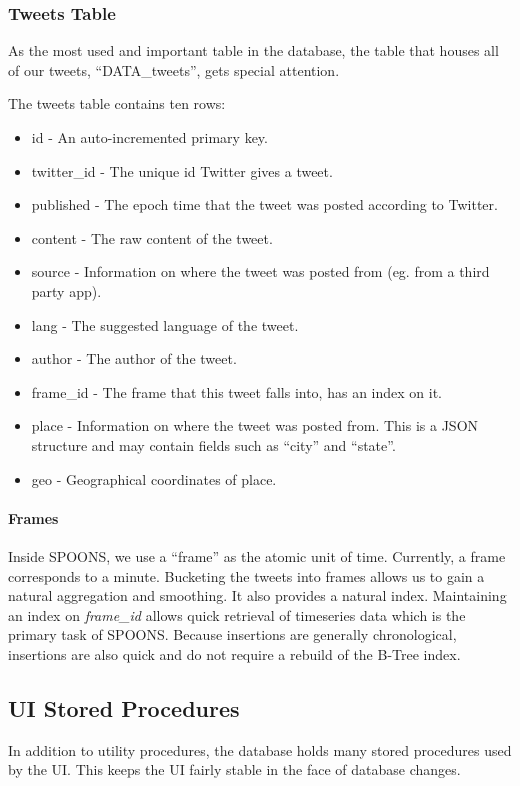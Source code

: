\documentclass[12pt]{ucthesis}
\begin{document}
\subsubsection{Tweets Table}
\label{arch-database-tables-tweets}
As the most used and important table in the database, the table that houses all of our tweets, ``DATA\_tweets'', gets special attention.

The tweets table contains ten rows:

\begin{itemize}
   \item id - An auto-incremented primary key.
   \item twitter\_id - The unique id Twitter gives a tweet.
   \item published - The epoch time that the tweet was posted according to Twitter.
   \item content - The raw content of the tweet.
   \item source - Information on where the tweet was posted from (eg. from a third party app).
   \item lang - The suggested language of the tweet.
   \item author - The author of the tweet.
   \item frame\_id - The frame that this tweet falls into, has an index on it.
   \item place - Information on where the tweet was posted from. This is a JSON structure and may contain fields such as ``city'' and ``state''.
   \item geo - Geographical coordinates of place.
\end{itemize}

\paragraph{Frames}
Inside SPOONS, we use a ``frame'' as the atomic unit of time. Currently, a frame corresponds to a minute. Bucketing the tweets into frames allows us to
gain a natural aggregation and smoothing. It also provides a natural index. Maintaining an index on \textit{frame\_id} allows quick retrieval of
timeseries data which is the primary task of SPOONS. Because insertions are generally chronological, insertions are also quick and do not require a
rebuild of the B-Tree index\cite{innodb}.

\subsection{UI Stored Procedures}
\label{arch-database-sp}
In addition to utility procedures, the database holds many stored procedures used by the UI.
This keeps the UI fairly stable in the face of database changes.
\end{document}
